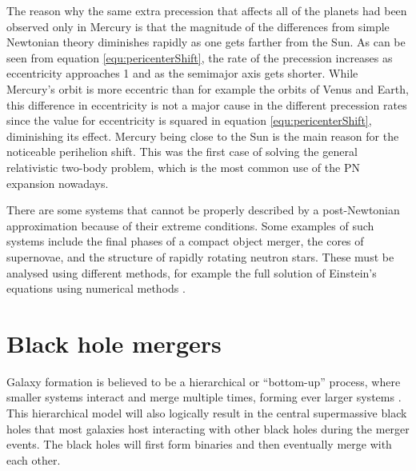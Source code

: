 \documentclass[english, oneside]{HYgradu}
\begin{document}
The reason why the same extra precession that affects all of the planets had been observed only in Mercury is that the magnitude of the differences from simple Newtonian theory diminishes rapidly as one gets farther from the Sun. As can be seen from equation \ref{equ:pericenterShift}, the rate of the precession increases as eccentricity approaches 1 and as the semimajor axis gets shorter. While Mercury's orbit is more eccentric than for example the orbits of Venus and Earth, this difference in eccentricity is not a major cause in the different precession rates since the value for eccentricity is squared in equation \ref{equ:pericenterShift}, diminishing its effect. Mercury being close to the Sun is the main reason for the noticeable perihelion shift.
This was the first case of solving the general relativistic two-body problem, which is the most common use of the PN expansion nowadays.
%

There are some systems that cannot be properly described by a post-Newtonian approximation because of their extreme conditions. Some examples of such systems include the final phases of a compact object merger, the cores of supernovae, and the structure of rapidly rotating neutron stars. These must be analysed using different methods, for example the full solution of Einstein's equations using numerical methods \citep{will:2006}. 

\section{Black hole mergers}

Galaxy formation is believed to be a hierarchical or ``bottom-up'' process, where smaller systems interact and merge multiple times, forming ever larger systems \citep{bt-galdyn}. This hierarchical model will also logically result in the central supermassive black holes that most galaxies host interacting with other black holes during the merger events. The black holes will first form binaries and then eventually merge with each other.
\end{document}
